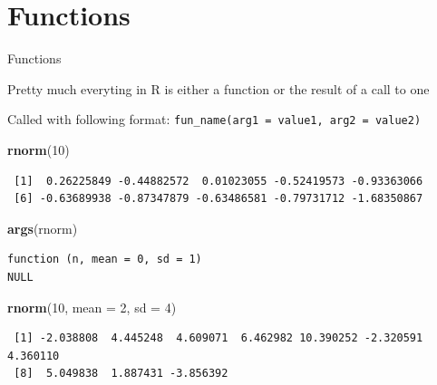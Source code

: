 \documentclass[10pt,ignorenonframetext,compress, aspectratio=169]{beamer}
\newenvironment{Shaded}{\begin{snugshade}}{\end{snugshade}}
\newcommand{\KeywordTok}[1]{\textcolor[rgb]{0.13,0.29,0.53}{\textbf{{#1}}}}
\newcommand{\DataTypeTok}[1]{\textcolor[rgb]{0.13,0.29,0.53}{{#1}}}
\newcommand{\DecValTok}[1]{\textcolor[rgb]{0.00,0.00,0.81}{{#1}}}
\newcommand{\NormalTok}[1]{{#1}}
\begin{document}
\section{Functions}\label{functions}

\begin{frame}[fragile]{Functions}

Pretty much everyting in R is either a \alert{function} or the result of
a call to one

Called with following format:
\texttt{fun\_name(arg1 = value1, arg2 = value2)}

\scriptsize

\begin{Shaded}
\begin{Highlighting}[]
\KeywordTok{rnorm}\NormalTok{(}\DecValTok{10}\NormalTok{)}
\end{Highlighting}
\end{Shaded}

\begin{verbatim}
 [1]  0.26225849 -0.44882572  0.01023055 -0.52419573 -0.93363066
 [6] -0.63689938 -0.87347879 -0.63486581 -0.79731712 -1.68350867
\end{verbatim}

\begin{Shaded}
\begin{Highlighting}[]
\KeywordTok{args}\NormalTok{(rnorm)}
\end{Highlighting}
\end{Shaded}

\begin{verbatim}
function (n, mean = 0, sd = 1) 
NULL
\end{verbatim}

\begin{Shaded}
\begin{Highlighting}[]
\KeywordTok{rnorm}\NormalTok{(}\DecValTok{10}\NormalTok{, }\DataTypeTok{mean =} \DecValTok{2}\NormalTok{, }\DataTypeTok{sd =} \DecValTok{4}\NormalTok{)}
\end{Highlighting}
\end{Shaded}

\begin{verbatim}
 [1] -2.038808  4.445248  4.609071  6.462982 10.390252 -2.320591  4.360110
 [8]  5.049838  1.887431 -3.856392
\end{verbatim}

\end{frame}
\end{document}
